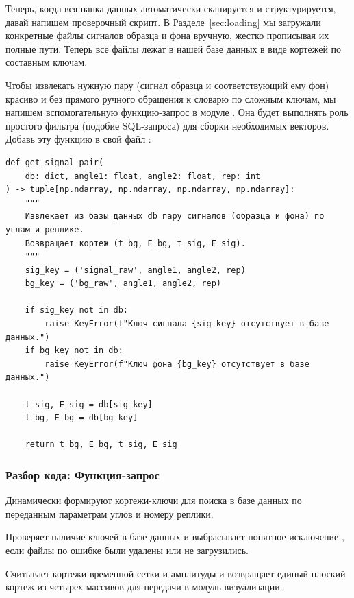 Теперь, когда вся папка данных автоматически сканируется и структурируется, давай напишем проверочный скрипт. В Разделе~\ref{sec:loading} мы загружали конкретные файлы сигналов образца и фона вручную, жестко прописывая их полные пути. Теперь все файлы лежат в нашей базе данных  в виде кортежей по составным ключам. 

Чтобы извлекать нужную пару (сигнал образца и соответствующий ему фон) красиво и без прямого ручного обращения к словарю по сложным ключам, мы напишем вспомогательную функцию-запрос  в модуле . Она будет выполнять роль простого фильтра (подобие SQL-запроса) для сборки необходимых векторов. Добавь эту функцию в свой файл :

\begin{listing}[H]
	\caption{Функция извлечения пары сигналов из базы данных ()}\label{lst:get_signal_pair}
	\begin{verbatim}
def get_signal_pair(
    db: dict, angle1: float, angle2: float, rep: int
) -> tuple[np.ndarray, np.ndarray, np.ndarray, np.ndarray]:
    """
    Извлекает из базы данных db пару сигналов (образца и фона) по углам и реплике.
    Возвращает кортеж (t_bg, E_bg, t_sig, E_sig).
    """
    sig_key = ('signal_raw', angle1, angle2, rep)
    bg_key = ('bg_raw', angle1, angle2, rep)
    
    if sig_key not in db:
        raise KeyError(f"Ключ сигнала {sig_key} отсутствует в базе данных.")
    if bg_key not in db:
        raise KeyError(f"Ключ фона {bg_key} отсутствует в базе данных.")
        
    t_sig, E_sig = db[sig_key]
    t_bg, E_bg = db[bg_key]
    
    return t_bg, E_bg, t_sig, E_sig
	\end{verbatim}
\end{listing}

\subsubsection[Разбор кода: Функция-запрос get\_signal\_pair]{Разбор кода: Функция-запрос }
\begin{syntaxdesc}
    \item[Составные ключи \mycode{sig_key} и \mycode{bg_key} (строки 8--9)] Динамически формируют кортежи-ключи для поиска в базе данных по переданным параметрам углов и номеру реплики.
    \item[Защитная проверка \mycode{if sig_key not in db} (строки 11--14)] Проверяет наличие ключей в базе данных и выбрасывает понятное исключение , если файлы по ошибке были удалены или не загрузились.
    \item[Извлечение и возврат данных \mycode{return t_bg, E_bg, t_sig, E_sig} (строки 16--19)] Считывает кортежи временной сетки и амплитуды и возвращает единый плоский кортеж из четырех массивов для передачи в модуль визуализации.
\end{syntaxdesc}

